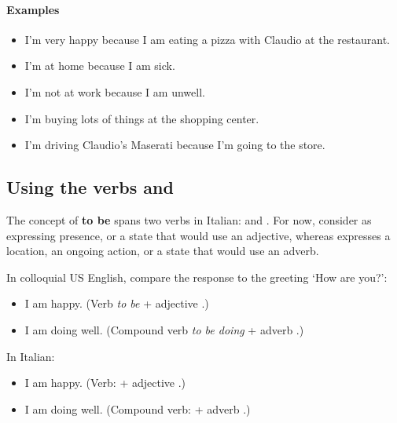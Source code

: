 \paragraph{Examples}
\begin{itemize}
    \item I'm very happy because I am eating a pizza with Claudio at the restaurant. \\
    \item I'm at home because I am sick. \\
    \item I'm not at work because I am unwell. \\
    \item I'm buying lots of things at the shopping center. \\
    \item I'm driving Claudio's Maserati because I'm going to the store. \\
\end{itemize}


\subsection{Using the verbs  and }
    The concept of \textbf{to be} spans two verbs in Italian:  and . 
	For now, consider  as expressing presence, or a state that would use an 
	adjective, whereas  expresses a location, an ongoing action, or 
	a state that would use an adverb. 

    In colloquial US English, compare the response to the greeting `How are you?':
\begin{itemize}[noitemsep]
    \item I am happy. (Verb \textit{to be} + adjective .)
    \item I am doing well. (Compound verb \textit{to be doing} + adverb .)
\end{itemize}

In Italian:
\begin{itemize}[noitemsep]
    \item I am happy. 
      (Verb:  + adjective .)
    \item I am doing well. 
      (Compound verb:  + adverb .)
\end{itemize}

